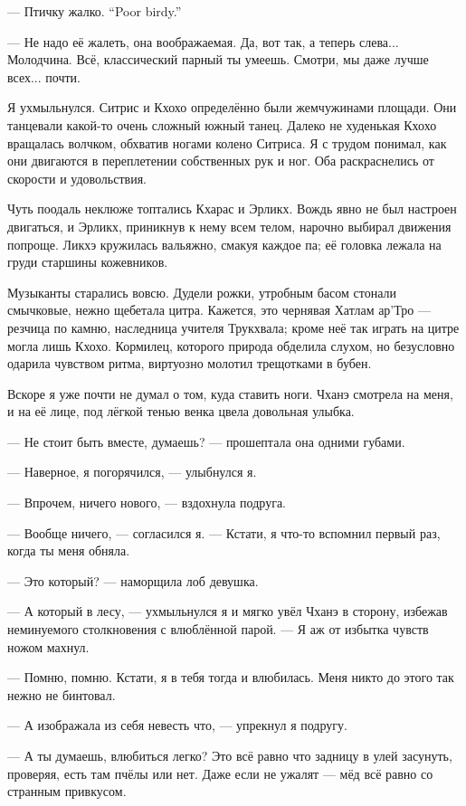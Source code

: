 {--- Птичку жалко.}
{``Poor birdy.''}

--- Не надо её жалеть, она воображаемая.
Да, вот так, а теперь слева...
Молодчина.
Всё, классический парный ты умеешь.
Смотри, мы даже лучше всех... почти.

Я ухмыльнулся.
Ситрис и Кхохо определённо были жемчужинами площади.
Они танцевали какой-то очень сложный южный танец.
Далеко не худенькая Кхохо вращалась волчком, обхватив ногами колено Ситриса.
Я с трудом понимал, как они двигаются в переплетении собственных рук и ног.
Оба раскраснелись от скорости и удовольствия.

Чуть поодаль неклюже топтались Кхарас и Эрликх.
Вождь явно не был настроен двигаться, и Эрликх, приникнув к нему всем телом, нарочно выбирал движения попроще.
Ликхэ кружилась вальяжно, смакуя каждое па;
её головка лежала на груди старшины кожевников.

Музыканты старались вовсю.
Дудели рожки, утробным басом стонали смычковые, нежно щебетала цитра.
Кажется, это чернявая Хатлам ар'Тро --- резчица по камню, наследница учителя Трукхвала;
кроме неё так играть на цитре могла лишь Кхохо.
Кормилец, которого природа обделила слухом, но безусловно одарила чувством ритма, виртуозно молотил трещотками в бубен.

Вскоре я уже почти не думал о том, куда ставить ноги.
Чханэ смотрела на меня, и на её лице, под лёгкой тенью венка цвела довольная улыбка.

--- Не стоит быть вместе, думаешь? --- прошептала она одними губами.

--- Наверное, я погорячился, --- улыбнулся я.

--- Впрочем, ничего нового, --- вздохнула подруга.

--- Вообще ничего, --- согласился я.
--- Кстати, я что-то вспомнил первый раз, когда ты меня обняла.

--- Это который? --- наморщила лоб девушка.

--- А который в лесу, --- ухмыльнулся я и мягко увёл Чханэ в сторону, избежав неминуемого столкновения с влюблённой парой.
--- Я аж от избытка чувств ножом махнул.

--- Помню, помню.
Кстати, я в тебя тогда и влюбилась.
Меня никто до этого так нежно не бинтовал.

--- А изображала из себя невесть что, --- упрекнул я подругу.

--- А ты думаешь, влюбиться легко?
Это всё равно что задницу в улей засунуть, проверяя, есть там пчёлы или нет.
Даже если не ужалят --- мёд всё равно со странным привкусом.

